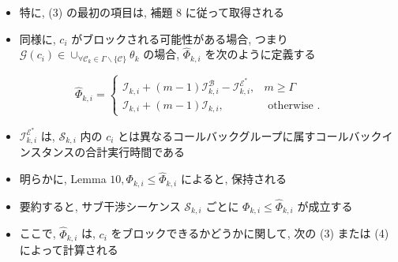\begin{frame}{}
    \begin{itemize}
        \item 特に, (3) の最初の項目は, 補題 8 に従って取得される
        \item 同様に, $c_{i}$ がブロックされる可能性がある場合, つまり $\mathcal{G}\left(c_{i}\right) \in \cup_{\forall \mathcal{C}_{k} \in \Gamma \backslash\{\mathcal{C}\}} \theta_{k}$ の場合, $\hat{\Phi}_{k, i}$ を次のように定義する
    \end{itemize}

    \begin{equation*}
        \hat{\Phi}_{k, i}=\left\{\begin{array}{lr}
            \mathcal{I}_{k, i}+(m-1) \mathcal{I}_{k, i}^{\mathcal{B}}-\mathcal{I}_{k, i}^{\mathcal{E}^{*}}, & m \geq \Gamma         \\
            \mathcal{I}_{k, i}+(m-1) \mathcal{I}_{k, i},                                                    & \text { otherwise } .
        \end{array}\right.
    \end{equation*}
\end{frame}

\begin{frame}{}
    \begin{itemize}
        \item $\mathcal{I}_{k, i}^{\mathcal{E}^{*}}$ は, $\mathcal{S}_{k, i}$ 内の $c_{i}$ とは異なるコールバックグループに属すコールバックインスタンスの合計実行時間である
        \item 明らかに, Lemma $10, \Phi_{k, i} \leq \hat{\Phi}_{k, i}$ によると, 保持される
        \item 要約すると, サブ干渉シーケンス $\mathcal{S}_{k, i}$ ごとに $\Phi_{k, i} \leq \hat{\Phi}_{k, i}$ が成立する
        \item ここで, $\hat{\Phi}_{k, i}$ は, $c_{i}$ をブロックできるかどうかに関して, 次の (3) または (4) によって計算される
    \end{itemize}
\end{frame}

